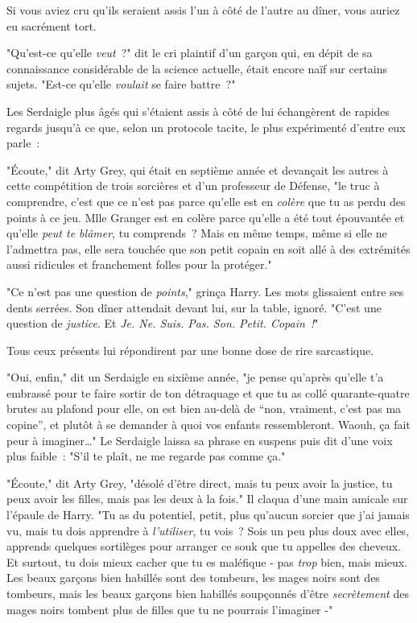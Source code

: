 \later

Si vous aviez cru qu'ils seraient assis l'un à côté de l'autre au dîner, vous auriez eu sacrément tort.

"Qu'est-ce qu'elle \emph{veut}~?" dit le cri plaintif d'un garçon qui, en dépit de sa connaissance considérable de la science actuelle, était encore naïf sur certains sujets. "Est-ce qu'elle \emph{voulait} se faire battre~?"

Les Serdaigle plus âgés qui s'étaient assis à côté de lui échangèrent de rapides regards jusqu'à ce que, selon un protocole tacite, le plus expérimenté d'entre eux parle~:

"Écoute," dit Arty Grey, qui était en septième année et devançait les autres à cette compétition de trois sorcières et d'un professeur de Défense, "le truc à comprendre, c'est que ce n'est pas parce qu'elle est en \emph{colère} que tu as perdu des points à ce jeu. Mlle Granger est en colère parce qu'elle a été tout épouvantée et qu'elle \emph{peut te blâmer}, tu comprends~? Mais en même temps, même si elle ne l'admettra pas, elle sera touchée que son petit copain en soit allé à des extrémités aussi ridicules et franchement folles pour la protéger."

"Ce n'est pas une question de \emph{points}," grinça Harry. Les mots glissaient entre ses dents serrées. Son dîner attendait devant lui, sur la table, ignoré. "C'est une question de \emph{justice}. Et \emph{Je. Ne. Suis. Pas. Son. Petit. Copain~!}"

Tous ceux présents lui répondirent par une bonne dose de rire sarcastique.

"Oui, enfin," dit un Serdaigle en sixième année, "je pense qu'après qu'elle t'a embrassé pour te faire sortir de ton détraquage et que tu as collé quarante-quatre brutes au plafond pour elle, on est bien au-delà de “non, vraiment, c'est pas ma copine”, et plutôt à se demander à quoi vos enfants ressembleront. Waouh, ça fait peur à imaginer…" Le Serdaigle laissa sa phrase en suspens puis dit d'une voix plus faible~: "S'il te plaît, ne me regarde pas comme ça."

"Écoute," dit Arty Grey, "désolé d'être direct, mais tu peux avoir la justice, tu peux avoir les filles, mais pas les deux à la fois." Il claqua d'une main amicale sur l'épaule de Harry. "Tu as du potentiel, petit, plus qu'aucun sorcier que j'ai jamais vu, mais tu dois apprendre à \emph{l'utiliser}, tu vois~? Sois un peu plus doux avec elles, apprends quelques sortilèges pour arranger ce souk que tu appelles des cheveux. Et surtout, tu dois mieux cacher que tu es maléfique - pas \emph{trop} bien, mais mieux. Les beaux garçons bien habillés sont des tombeurs, les mages noirs sont des tombeurs, mais les beaux garçons bien habillés soupçonnés d'être \emph{secrètement} des mages noirs tombent plus de filles que tu ne pourrais l'imaginer -"

